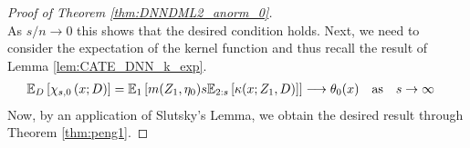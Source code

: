 \begin{proof}[Proof of Theorem \ref{thm:DNNDML2_anorm_0}]
\begin{equation}
    \end{equation}
    As $s/n \rightarrow 0$ this shows that the desired condition holds.
    Next, we need to consider the expectation of the kernel function and thus recall the result of Lemma \ref{lem:CATE_DNN_k_exp}.
    \begin{equation}
		  \begin{aligned}
			\mathbb{E}_D\left[\chi_{s,0}\left(x; D\right)\right]
			& = \mathbb{E}_{1}\left[m(Z_1, \eta_0)
			s\mathbb{E}_{2:s}\left[\kappa(x; Z_1, D)\right]\right]
            \longrightarrow \theta_{0}(x) \quad \text{as} \quad s \rightarrow \infty
		\end{aligned}
	\end{equation}
    Now, by an application of Slutsky's Lemma, we obtain the desired result through Theorem \ref{thm:peng1}.
\end{proof}